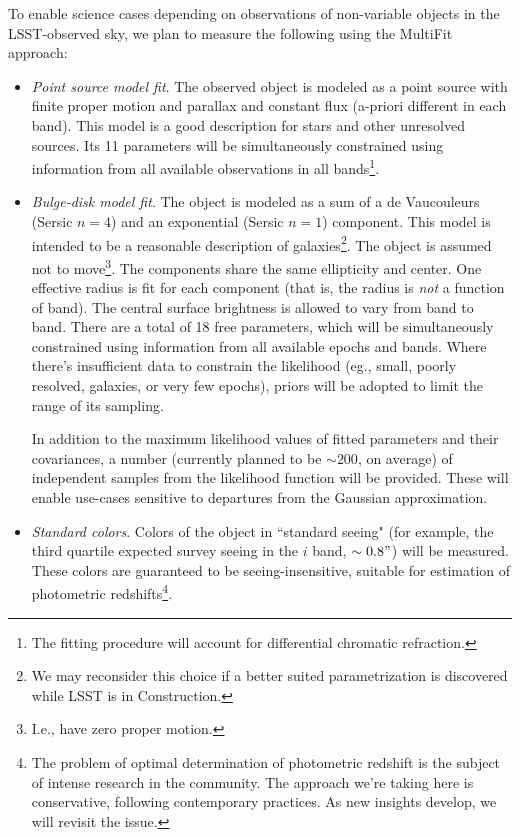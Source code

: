 \documentclass[12pt]{article}
\begin{document}
\vspace{1em}

To enable science cases depending on observations of non-variable objects in the LSST-observed sky, we plan to measure the following using the MultiFit approach:
%
\begin{itemize}
    \item {\em Point source model fit}. The observed object is modeled as a point source with finite proper motion and parallax and constant flux (a-priori different in each band). This model is a good description for stars and other unresolved sources. Its 11 parameters will be simultaneously constrained using information from all available observations in all bands\footnote{The fitting procedure will account for differential chromatic refraction.}.
    \item {\em Bulge-disk model fit}. The object is modeled as a sum of a de Vaucouleurs (Sersic $n=4$) and an exponential (Sersic $n=1$) component. This model is intended to be a reasonable description of galaxies\footnote{We may reconsider this choice if a better suited parametrization is discovered while LSST is in Construction.}. The object is assumed not to move\footnote{I.e., have zero proper motion.}. The components share the same ellipticity and center. One effective radius is fit for each component (that is, the radius is {\em not} a function of band). The central surface brightness is allowed to vary from band to band. There are a total of 18 free parameters, which will be simultaneously constrained using information from all available epochs and bands. Where there's insufficient data to constrain the likelihood (eg., small, poorly resolved, galaxies, or very few epochs), priors will be adopted to limit the range of its sampling.

   In addition to the maximum likelihood values of fitted parameters and their covariances, a number (currently planned to be $\sim 200$, on average) of independent samples from the likelihood function will be provided. These will enable use-cases sensitive to departures from the Gaussian approximation.

    \item {\em Standard colors}. Colors of the object in ``standard seeing" (for example, the third quartile expected survey seeing in the $i$ band, $\sim 0.8"$) will be measured. These colors are guaranteed to be seeing-insensitive,  suitable for estimation of photometric redshifts\footnote{The problem of optimal determination of photometric redshift is the subject of intense research in the community. The approach we're taking here is conservative, following contemporary practices. As new insights develop, we will revisit the issue.}.


\end{itemize}
\end{document}
